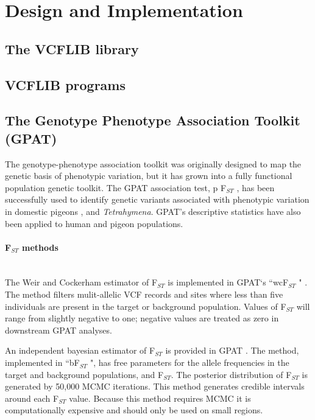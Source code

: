 \documentclass[10pt,letterpaper]{article}
\begin{document}
\section*{Design and Implementation}



\subsection*{The VCFLIB library}

\subsection*{VCFLIB programs}



\subsection*{The Genotype Phenotype Association Toolkit (GPAT)}

The genotype-phenotype association toolkit was originally designed to map the genetic basis of phenotypic variation, but it has grown into a fully functional population genetic toolkit.  The GPAT association test, p F$_{ST}$ , has been successfully used to identify genetic variants associated with phenotypic variation in domestic pigeons
 \cite{color},  and \textit{Tetrahymena}\cite{tet}.  GPAT's descriptive statistics have also been applied to human\cite{iron} and pigeon\cite{pigeon} populations.




\paragraph*{ F$_{ST}$  methods} \mbox{} \\

The Weir and Cockerham estimator of F$_{ST}$ is implemented in GPAT`s ``wcF$_{ST}$ " \cite{fst}.  The method filters mulit-allelic VCF records and sites where less than five individuals are present in the target or background population. Values of F$_{ST}$ will range from slightly negative to one; negative values are treated as zero in downstream GPAT analyses. 

An independent bayesian estimator of F$_{ST}$ is provided in GPAT \cite{bfst}.  The method, implemented in ``bF$_{ST}$ ", has free parameters for the allele frequencies in the target and background populations, and F$_{ST}$.  The posterior distribution of F$_{ST}$ is generated by 50,000 MCMC iterations.  This method generates credible intervals around each F$_{ST}$ value.  Because this method requires MCMC it is computationally expensive and should only be used on small regions.
\end{document}
